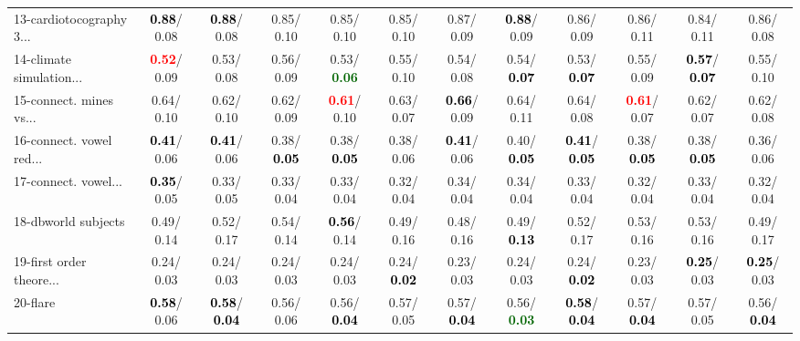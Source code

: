 \begin{table}[h]
\begin{center}
{\begin{tabular}{lc|c|c|c|c|c|c|c|c|c|c}
13-cardiotocography 3... & \textcolor{black}{\textbf{  0.88}}/  0.08 & \textcolor{black}{\textbf{  0.88}}/  0.08 &   0.85/  0.10 &   0.85/  0.10 &   0.85/  0.10 &   0.87/  0.09 & \textcolor{black}{\textbf{  0.88}}/  0.09 &   0.86/  0.09 &   0.86/  0.11 &   0.84/  0.11 &   0.86/  0.08 \\
14-climate simulation... & \textcolor{red}{\textbf{  0.52}}/  0.09 &   0.53/  0.08 &   0.56/  0.09 &   0.53/\textcolor{darkgreen}{\textbf{  0.06}} &   0.55/  0.10 &   0.54/  0.08 &   0.54/\textcolor{black}{\textbf{  0.07}} &   0.53/\textcolor{black}{\textbf{  0.07}} &   0.55/  0.09 & \textcolor{black}{\textbf{  0.57}}/\textcolor{black}{\textbf{  0.07}} &   0.55/  0.10 \\ \hline
15-connect. mines vs... &   0.64/  0.10 &   0.62/  0.10 &   0.62/  0.09 & \textcolor{red}{\textbf{  0.61}}/  0.10 &   0.63/  0.07 & \textcolor{black}{\textbf{  0.66}}/  0.09 &   0.64/  0.11 &   0.64/  0.08 & \textcolor{red}{\textbf{  0.61}}/  0.07 &   0.62/  0.07 &   0.62/  0.08 \\
16-connect. vowel red... & \textcolor{black}{\textbf{  0.41}}/  0.06 & \textcolor{black}{\textbf{  0.41}}/  0.06 &   0.38/\textcolor{black}{\textbf{  0.05}} &   0.38/\textcolor{black}{\textbf{  0.05}} &   0.38/  0.06 & \textcolor{black}{\textbf{  0.41}}/  0.06 &   0.40/\textcolor{black}{\textbf{  0.05}} & \textcolor{black}{\textbf{  0.41}}/\textcolor{black}{\textbf{  0.05}} &   0.38/\textcolor{black}{\textbf{  0.05}} &   0.38/\textcolor{black}{\textbf{  0.05}} &   0.36/  0.06 \\
17-connect. vowel... & \textcolor{black}{\textbf{  0.35}}/  0.05 &   0.33/  0.05 &   0.33/  0.04 &   0.33/  0.04 &   0.32/  0.04 &   0.34/  0.04 &   0.34/  0.04 &   0.33/  0.04 &   0.32/  0.04 &   0.33/  0.04 &   0.32/  0.04 \\
18-dbworld subjects &   0.49/  0.14 &   0.52/  0.17 &   0.54/  0.14 & \textcolor{black}{\textbf{  0.56}}/  0.14 &   0.49/  0.16 &   0.48/  0.16 &   0.49/\textcolor{black}{\textbf{  0.13}} &   0.52/  0.17 &   0.53/  0.16 &   0.53/  0.16 &   0.49/  0.17 \\
19-first order theore... &   0.24/  0.03 &   0.24/  0.03 &   0.24/  0.03 &   0.24/  0.03 &   0.24/\textcolor{black}{\textbf{  0.02}} &   0.23/  0.03 &   0.24/  0.03 &   0.24/\textcolor{black}{\textbf{  0.02}} &   0.23/  0.03 & \textcolor{black}{\textbf{  0.25}}/  0.03 & \textcolor{black}{\textbf{  0.25}}/  0.03 \\
20-flare & \textcolor{black}{\textbf{  0.58}}/  0.06 & \textcolor{black}{\textbf{  0.58}}/\textcolor{black}{\textbf{  0.04}} &   0.56/  0.06 &   0.56/\textcolor{black}{\textbf{  0.04}} &   0.57/  0.05 &   0.57/\textcolor{black}{\textbf{  0.04}} &   0.56/\textcolor{darkgreen}{\textbf{  0.03}} & \textcolor{black}{\textbf{  0.58}}/\textcolor{black}{\textbf{  0.04}} &   0.57/\textcolor{black}{\textbf{  0.04}} &   0.57/  0.05 &   0.56/\textcolor{black}{\textbf{  0.04}} \\

\end{tabular}}
\end{center}
\end{table}
